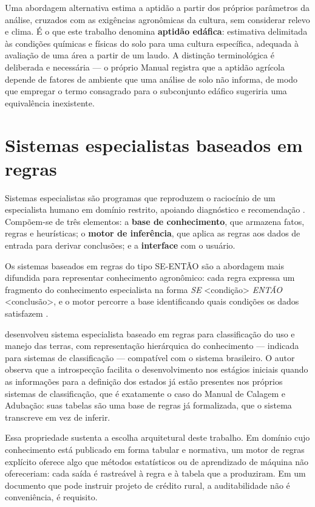 Uma abordagem alternativa estima a aptidão a partir dos próprios parâmetros da análise,
cruzados com as exigências agronômicas da cultura, sem considerar relevo e clima. É o
que este trabalho denomina \textbf{aptidão edáfica}: estimativa delimitada às condições
químicas e físicas do solo para uma cultura específica, adequada à avaliação de uma área
a partir de um laudo. A distinção terminológica é deliberada e necessária --- o próprio
Manual \citep[Cap.~2, p.~23]{ManualCalagem2016} registra que a aptidão agrícola depende
de fatores de ambiente que uma análise de solo não informa, de modo que empregar o termo
consagrado para o subconjunto edáfico sugeriria uma equivalência inexistente.

\section{Sistemas especialistas baseados em regras}

Sistemas especialistas são programas que reproduzem o raciocínio de um especialista
humano em domínio restrito, apoiando diagnóstico e recomendação \citep{SantosEtAl1994}.
Compõem-se de três elementos: a \textbf{base de conhecimento}, que armazena fatos,
regras e heurísticas; o \textbf{motor de inferência}, que aplica as regras aos dados de
entrada para derivar conclusões; e a \textbf{interface} com o usuário.

Os sistemas baseados em regras do tipo SE-ENTÃO são a abordagem mais difundida para
representar conhecimento agronômico: cada regra expressa um fragmento do conhecimento
especialista na forma \textit{SE} <condição> \textit{ENTÃO} <conclusão>, e o motor
percorre a base identificando quais condições os dados satisfazem \citep{Lanzer2010}.

\cite{Lanzer2010} desenvolveu sistema especialista baseado em regras para classificação
do uso e manejo das terras, com representação hierárquica do conhecimento --- indicada
para sistemas de classificação --- compatível com o sistema brasileiro. O autor observa
que a introspecção facilita o desenvolvimento nos estágios iniciais quando as
informações para a definição dos estados já estão presentes nos próprios sistemas de
classificação, que é exatamente o caso do Manual de Calagem e Adubação: suas tabelas são
uma base de regras já formalizada, que o sistema transcreve em vez de inferir.

Essa propriedade sustenta a escolha arquitetural deste trabalho. Em domínio cujo
conhecimento está publicado em forma tabular e normativa, um motor de regras explícito
oferece algo que métodos estatísticos ou de aprendizado de máquina não ofereceriam:
cada saída é rastreável à regra e à tabela que a produziram. Em um documento que pode
instruir projeto de crédito rural, a auditabilidade não é conveniência, é requisito.

